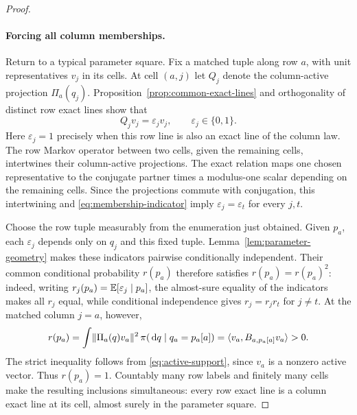 \begin{proof}
\paragraph{Forcing all column memberships.}
Return to a typical parameter square. Fix a matched tuple along row
$a$, with unit representatives $v_j$ in its cells. At cell $(a,j)$ let
$Q_j$ denote the column-active projection $\Pi_a(q_j)$.
Proposition~\ref{prop:common-exact-lines} and orthogonality of distinct
row exact lines show that
\begin{equation}\label{eq:membership-indicator}
 Q_jv_j=\varepsilon_jv_j,\qquad \varepsilon_j\in\{0,1\}.
\end{equation}
Here $\varepsilon_j=1$ precisely when this row line is also an exact
line of the column law.
The row Markov operator between two cells, given the remaining cells,
intertwines their column-active projections. The exact relation maps
one chosen representative to the conjugate partner times a
modulus-one scalar depending on the remaining cells. Since the
projections commute with conjugation, this intertwining and
\eqref{eq:membership-indicator} imply
$\varepsilon_j=\varepsilon_t$ for every $j,t$.

Choose the row tuple measurably from the enumeration just obtained.
Given $p_a$, each $\varepsilon_j$ depends only on $q_j$ and this fixed
tuple. Lemma~\ref{lem:parameter-geometry} makes these indicators
pairwise conditionally independent. Their common conditional
probability $r(p_a)$ therefore satisfies $r(p_a)=r(p_a)^2$:
indeed, writing $r_j(p_a)=\mathbb E[\varepsilon_j\mid p_a]$, the almost-sure
equality of the indicators makes all $r_j$ equal, while conditional
independence gives $r_j=r_jr_t$ for $j\ne t$.
At the matched column $j=a$, however,
\[
 r(p_a)=\int\lVert \Pi_a(q)v_a\rVert^2\,
             \pi(\,\mathrm d q\mid q_a=p_a[a])
       =\langle v_a,B_{a,p_a[a]}v_a\rangle>0.
\]
The strict inequality follows from \eqref{eq:active-support}, since
$v_a$ is a nonzero active vector. Thus $r(p_a)=1$.
Countably many row labels and finitely many cells make the resulting
inclusions simultaneous: every row exact line is a column exact line
at its cell, almost surely in the parameter square.


\end{proof}

